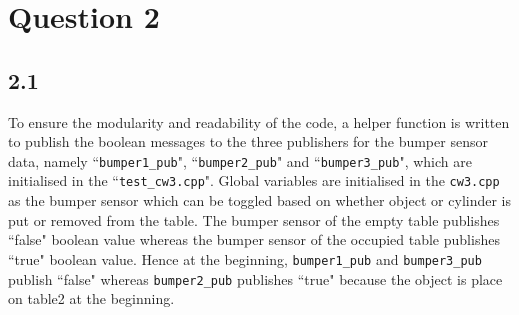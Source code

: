 \documentclass[a4paper,12pt]{article}
\begin{document}
\newpage
\section{Question 2}
\subsection{2.1}
To ensure the modularity and readability of the code, a helper function is written to publish the boolean messages to the three publishers for the bumper sensor data, namely ``\texttt{bumper1\_pub}", ``\texttt{bumper2\_pub}" and ``\texttt{bumper3\_pub}", which are initialised in the ``\texttt{test\_cw3.cpp}". Global variables are initialised in the \texttt{cw3.cpp} as the bumper sensor which can be toggled based on whether object or cylinder is put or removed from the table. The bumper sensor of the empty table publishes ``false" boolean value whereas the bumper sensor of the occupied table publishes ``true" boolean value. Hence at the beginning, \texttt{bumper1\_pub} and \texttt{bumper3\_pub} publish ``false" whereas \texttt{bumper2\_pub} publishes ``true" because the object is place on table2 at the beginning.
\end{document}
